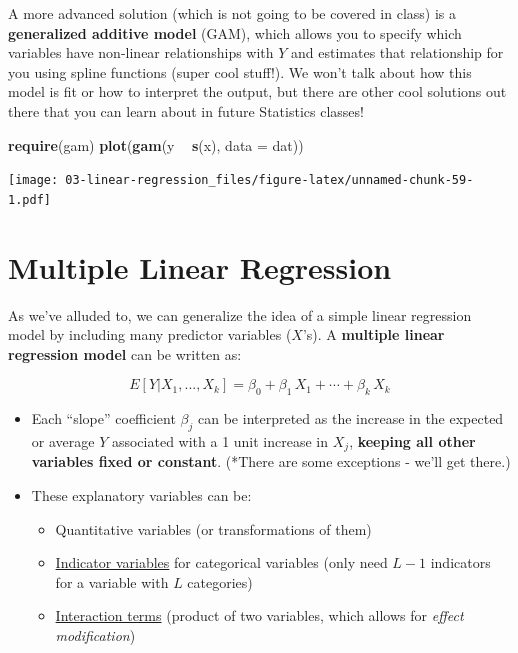 \documentclass[
]{book}
\newenvironment{Shaded}{\begin{snugshade}}{\end{snugshade}}
\newcommand{\DataTypeTok}[1]{\textcolor[rgb]{0.13,0.29,0.53}{#1}}
\newcommand{\KeywordTok}[1]{\textcolor[rgb]{0.13,0.29,0.53}{\textbf{#1}}}
\newcommand{\NormalTok}[1]{#1}
\newcommand{\OperatorTok}[1]{\textcolor[rgb]{0.81,0.36,0.00}{\textbf{#1}}}
\newcommand{\StringTok}[1]{\textcolor[rgb]{0.31,0.60,0.02}{#1}}
\providecommand{\tightlist}{%
  \setlength{\itemsep}{0pt}\setlength{\parskip}{0pt}}
\begin{document}
A more advanced solution (which is not going to be covered in class) is a \textbf{generalized additive model} (GAM), which allows you to specify which variables have non-linear relationships with \(Y\) and estimates that relationship for you using spline functions (super cool stuff!). We won't talk about how this model is fit or how to interpret the output, but there are other cool solutions out there that you can learn about in future Statistics classes!

\begin{Shaded}
\begin{Highlighting}[]
\KeywordTok{require}\NormalTok{(gam)}
\KeywordTok{plot}\NormalTok{(}\KeywordTok{gam}\NormalTok{(y }\OperatorTok{~}\StringTok{ }\KeywordTok{s}\NormalTok{(x), }\DataTypeTok{data =}\NormalTok{ dat))}
\end{Highlighting}
\end{Shaded}

\texttt{[image: 03-linear-regression\_files/figure-latex/unnamed-chunk-59-1.pdf]}

\hypertarget{multiple}{%
\section{Multiple Linear Regression}\label{multiple}}

As we've alluded to, we can generalize the idea of a simple linear regression model by including many predictor variables (\(X\)'s). A \textbf{multiple linear regression model} can be written as:

\[ E[Y |X_1,...,X_k ] = \beta_0 + \beta_1\,X_{1} + \cdots + \beta_k\,X_{k}  \]

\begin{itemize}
\item
  Each ``slope'' coefficient \(\beta_j\) can be interpreted as the increase in the expected or average \(Y\) associated with a 1 unit increase in \(X_j\), \textbf{keeping all other variables fixed or constant}. (*There are some exceptions - we'll get there.)
\item
  These explanatory variables can be:

  \begin{itemize}
  \tightlist
  \item
    Quantitative variables (or transformations of them)
  \item
    \protect\hyperlink{indicator-variables}{Indicator variables} for categorical variables (only need \(L-1\) indicators for a variable with \(L\) categories)
  \item
    \protect\hyperlink{interaction-variables}{Interaction terms} (product of two variables, which allows for \emph{effect modification})
  \end{itemize}
\end{itemize}
\end{document}
